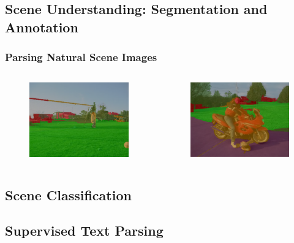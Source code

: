 \documentclass{beamer}
\begin{document}
\subsection{Scene Understanding: Segmentation and Annotation}
\frame
{
  \frametitle{Parsing Natural Scene Images}
  \begin{columns}
  \begin{figure}[ht]  
	  \begin{center}
		  \includegraphics[width=2.1in]{images/ex1_ext.png}   
	  \end{center}   
  \end{figure}
  \begin{figure}[ht]
	  \begin{center}
		  \includegraphics[width=2.1in]{images/ex1_ext2.png} 
	  \end{center}
  \end{figure}
  \end{columns}
}
\subsection{Scene Classification}
\frame
{
}
\subsection{Supervised Text Parsing}
\frame
{
}
\end{document}
